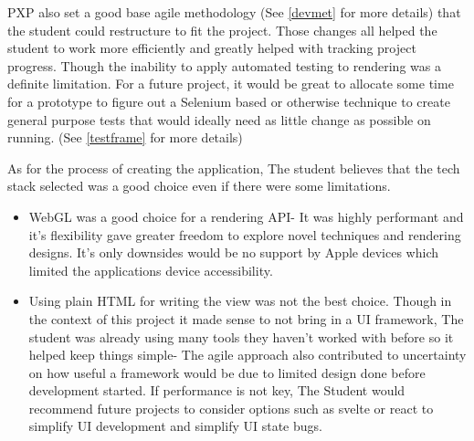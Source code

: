PXP also set a good base agile methodology (See \ref{devmet} for more details) that the student could restructure to fit the project. Those changes all helped the student to work more efficiently and greatly helped with tracking project progress. Though the inability to apply automated testing to rendering was a definite limitation. For a future project, it would be great to allocate some time for a prototype to figure out a Selenium based or otherwise technique to create general purpose tests that would ideally need as little change as possible on running. (See \ref{testframe} for more details)

As for the process of creating the application, The student believes that the tech stack selected was a good choice even if there were some limitations.
\begin{itemize}
    \item WebGL was a good choice for a rendering API- It was highly performant and it's flexibility gave greater freedom to explore novel techniques and rendering designs. It's only downsides would be no support by Apple devices \cite[]{apple_metal} which limited the applications device accessibility.
    \item Using plain HTML for writing the view was not the best choice. Though in the context of this project it made sense to not bring in a UI framework, The student was already using many tools they haven't worked with before so it helped keep things simple- The agile approach also contributed to uncertainty on how useful a framework would be due to limited design done before development started. If performance is not key, The Student would recommend future projects to consider options such as svelte or react to simplify UI development and simplify UI state bugs.
\end{itemize}

